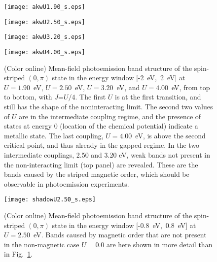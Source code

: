 \documentclass[aps,prb,superscriptaddress,preprintnumbers,
showpacs,legalpaper,twoside,twocolumn,amsmath,amssymb]{revtex4}
\begin{document}
\begin{figure}[h]
\begin{center}
\centerline{\texttt{[image: akwU1.90\_s.eps]}}
\centerline{\texttt{[image: akwU2.50\_s.eps]}}
\centerline{\texttt{[image: akwU3.20\_s.eps]}}
\centerline{\texttt{[image: akwU4.00\_s.eps]}}
%
%
%
\caption{(Color online) Mean-field photoemission band structure of
the spin-striped $(0,\pi)$ state in the
energy window [-2~eV,~2~eV] at $U=1.90$~eV, $U=2.50$~eV, $U=3.20$~eV,
and $U=4.00$~eV, from top to bottom, with $J$=$U/4$. The first $U$ is at the
first transition, and still has the shape of the noninteracting limit.
The second two values of $U$ are in the intermediate coupling
regime, and the presence of states at energy $0$ (location of the chemical
potential) indicate a metallic state. The last coupling, $U=4.00$~eV,
is above the second critical point, and thus already
in the gapped regime. In the two intermediate couplings, 2.50 and 3.20 eV, weak
bands not present in the non-interacting limit (top panel) are revealed. These are the bands
 caused by the striped magnetic order, which should be observable in photoemission experiments.}
\label{F.Band}
\vskip -0.9cm
\end{center}
\end{figure}


\begin{figure}[h]
\begin{center}
\centerline{\texttt{[image: shadowU2.50\_s.eps]}}
\caption{(Color online) Mean-field photoemission band structure of
the spin-striped $(0,\pi)$ state in the
energy window [-0.8~eV,~0.8~eV] at $U=2.50$~eV.
Bands caused by magnetic order
that are not present in the non-magnetic case $U=0.0$ are here shown
in more detail than in Fig.~\ref{F.Band}.
}
\label{F.shadow}
\vskip -0.9cm
\end{center}
\end{figure}
\end{document}
